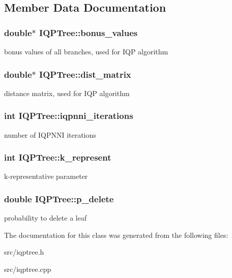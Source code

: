 \subsection{Member Data Documentation}
\hypertarget{classIQPTree_ae9f6d55e262018addddb737f16ca1bd5}{
\subsubsection[{bonus\_\-values}]{\setlength{\rightskip}{0pt plus 5cm}double$\ast$ {\bf IQPTree::bonus\_\-values}}}
\label{classIQPTree_ae9f6d55e262018addddb737f16ca1bd5}
bonus values of all branches, used for IQP algorithm \hypertarget{classIQPTree_a48c7ed5f847b021180e600b1d779c8cb}{
\subsubsection[{dist\_\-matrix}]{\setlength{\rightskip}{0pt plus 5cm}double$\ast$ {\bf IQPTree::dist\_\-matrix}}}
\label{classIQPTree_a48c7ed5f847b021180e600b1d779c8cb}
distance matrix, used for IQP algorithm \hypertarget{classIQPTree_aee1659fac7169d2adca3e9b2609b638e}{
\subsubsection[{iqpnni\_\-iterations}]{\setlength{\rightskip}{0pt plus 5cm}int {\bf IQPTree::iqpnni\_\-iterations}}}
\label{classIQPTree_aee1659fac7169d2adca3e9b2609b638e}
number of IQPNNI iterations \hypertarget{classIQPTree_a3ee6ae6c50af3a0bf669e7f550a5d670}{
\subsubsection[{k\_\-represent}]{\setlength{\rightskip}{0pt plus 5cm}int {\bf IQPTree::k\_\-represent}}}
\label{classIQPTree_a3ee6ae6c50af3a0bf669e7f550a5d670}
k-\/representative parameter \hypertarget{classIQPTree_a74e9e5f5ce563559d2788818f0584459}{
\subsubsection[{p\_\-delete}]{\setlength{\rightskip}{0pt plus 5cm}double {\bf IQPTree::p\_\-delete}}}
\label{classIQPTree_a74e9e5f5ce563559d2788818f0584459}
probability to delete a leaf 

The documentation for this class was generated from the following files:\begin{DoxyCompactItemize}
\item 
src/iqptree.h\item 
src/iqptree.cpp\end{DoxyCompactItemize}
